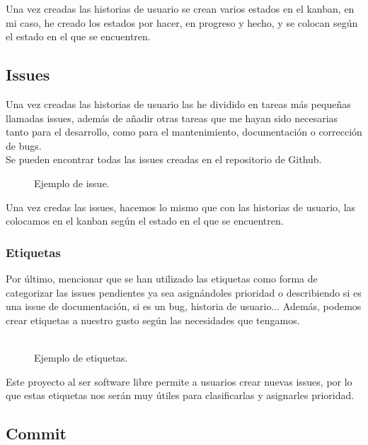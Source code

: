 Una vez creadas las historias de usuario se crean varios estados en el kanban, en mi caso, he creado los estados por hacer, en progreso y hecho, y se colocan según el estado en el que se encuentren.

\subsection{Issues}

Una vez creadas las historias de usuario las he dividido en tareas más pequeñas llamadas issues, 
además de añadir otras tareas que me hayan sido necesarias tanto para el desarrollo, como para el mantenimiento, 
documentación o corrección de bugs.\\
Se pueden encontrar todas las issues creadas en el repositorio de Github\cite{issues}.

\begin{figure}[H]
	\centering
	\noindent{}
	\caption{Ejemplo de issue.}
  	\end{figure}

Una vez credas las issues, hacemos lo mismo que con las historias de usuario, las colocamos en el kanban según el estado en el que se encuentren.

\subsubsection{Etiquetas}

Por último, mencionar que se han utilizado las etiquetas como forma de categorizar las issues pendientes ya sea asignándoles prioridad o describiendo si es una issue de documentación, si es un bug, historia de usuario...
Además, podemos crear etiquetas a nuestro gusto según las necesidades que tengamos.\\ \\

\begin{figure}[H]
	\centering
	\noindent{}
	\caption{Ejemplo de etiquetas.}
	\end{figure}

Este proyecto al ser software libre permite a usuarios crear nuevas issues, por lo que estas etiquetas nos serán muy útiles para clasificarlas y asignarles prioridad.

\subsection{Commit}

